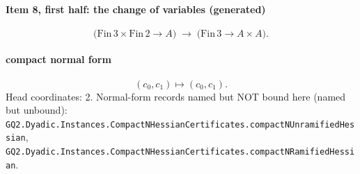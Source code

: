 \paragraph{Item 8, first half: the change of variables (generated)}
\[\bigl(\mathrm{Fin}\,3\times\mathrm{Fin}\,2\to A\bigr)\;\longrightarrow\;\bigl(\mathrm{Fin}\,3\to A\times A\bigr).\]
\paragraph{compact normal form}
\[(c_0,c_1)\mapsto(c_0,c_1).\]
Head coordinates: 2. Normal-form records named but NOT bound here (named but unbound): \texttt{GQ2.Dyadic.Instances.CompactNHessianCertificates.compactNUnramifiedHessian}, \texttt{GQ2.Dyadic.Instances.CompactNHessianCertificates.compactNRamifiedHessian}.
